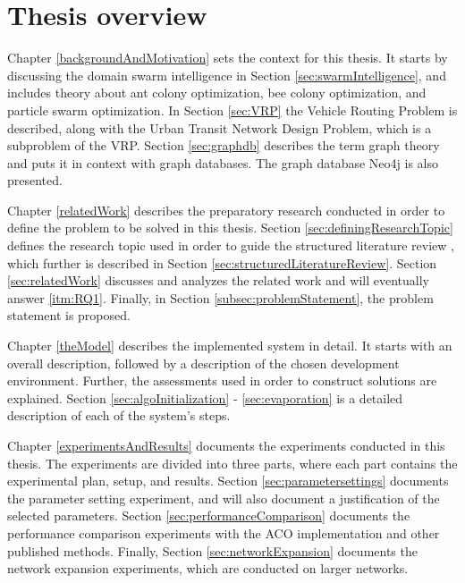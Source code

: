 \section{Thesis overview}



Chapter \ref{backgroundAndMotivation} sets the context for this thesis. It starts by discussing the domain swarm intelligence in Section \ref{sec:swarmIntelligence}, and includes theory about ant colony optimization, bee colony optimization, and particle swarm optimization. In Section \ref{sec:VRP} the Vehicle Routing Problem is described, along with the Urban Transit Network Design Problem, which is a subproblem of the VRP. Section \ref{sec:graphdb} describes the term graph theory and puts it in context with graph databases. The graph database Neo4j is also presented. 

Chapter \ref{relatedWork} describes the preparatory research conducted in order to define the problem to be solved in this thesis. Section \ref{sec:definingResearchTopic} defines the research topic used in order to guide the structured literature review \citep{kofod2014}, which further is described in Section \ref{sec:structuredLiteratureReview}. Section \ref{sec:relatedWork} discusses and analyzes the related work and will eventually answer \ref{itm:RQ1}. Finally, in Section \ref{subsec:problemStatement}, the problem statement is proposed.  

Chapter \ref{theModel} describes the implemented system in detail. It starts with an overall description, followed by a description of the chosen development environment. Further, the assessments used in order to construct solutions are explained. Section \ref{sec:algoInitialization} - \ref{sec:evaporation} is a detailed description of each of the system's steps.

Chapter \ref{experimentsAndResults} documents the experiments conducted in this thesis. The experiments are divided into three parts, where each part contains the experimental plan, setup, and results. Section \ref{sec:parametersettings} documents the parameter setting experiment, and will also document a justification of the selected parameters. Section \ref{sec:performanceComparison} documents the performance comparison experiments with the ACO implementation and other published methods. Finally, Section \ref{sec:networkExpansion} documents the network expansion experiments, which are conducted on larger networks. 

